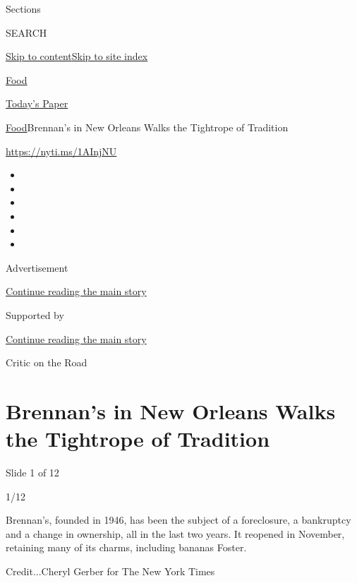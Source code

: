 Sections

SEARCH

\protect\hyperlink{site-content}{Skip to
content}\protect\hyperlink{site-index}{Skip to site index}

\href{https://www.nytimes3xbfgragh.onion/section/food}{Food}

\href{https://myaccount.nytimes3xbfgragh.onion/auth/login?response_type=cookie\&client_id=vi}{}

\href{https://www.nytimes3xbfgragh.onion/section/todayspaper}{Today's
Paper}

\href{/section/food}{Food}\textbar{}Brennan's in New Orleans Walks the
Tightrope of Tradition

\url{https://nyti.ms/1AInjNU}

\begin{itemize}
\item
\item
\item
\item
\item
\item
\end{itemize}

Advertisement

\protect\hyperlink{after-top}{Continue reading the main story}

Supported by

\protect\hyperlink{after-sponsor}{Continue reading the main story}

Critic on the Road

\hypertarget{brennans-in-new-orleans-walks-the-tightrope-of-tradition}{%
\section{Brennan's in New Orleans Walks the Tightrope of
Tradition}\label{brennans-in-new-orleans-walks-the-tightrope-of-tradition}}

Slide 1 of 12

1/12

Brennan's, founded in 1946, has been the subject of a foreclosure, a
bankruptcy and a change in ownership, all in the last two years. It
reopened in November, retaining many of its charms, including bananas
Foster.

Credit...Cheryl Gerber for The New York Times

